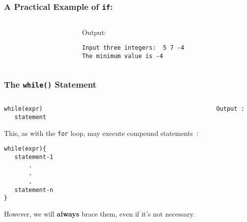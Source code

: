 \begin{frame}[fragile]
\frametitle{A Practical Example of {\tt if}:}
\begin{columns}

\begin{column}{0.5\textwidth}

\end{column}

\begin{column}{0.40\textwidth}
Output:\\
\begin{verbatim}
Input three integers:  5 7 -4
The minimum value is -4
\end{verbatim}
\end{column}

\end{columns}
\end{frame}

\begin{frame}[fragile]
\frametitle{The {\tt while()} Statement}
\begin{columns}

\begin{column}{0.45\textwidth}
\begin{lstlisting}[style=basicc,numbers=none]
while(expr)
   statement
\end{lstlisting}

This, as with the {\tt for} loop, may execute compound statements~:

\begin{lstlisting}[style=basicc,numbers=none]
while(expr){
   statement-1
       .
       .
       .
   statement-n
}
\end{lstlisting}
However, we will {\bf always} brace them, even if it's not necessary.
\end{column}

\begin{column}{0.45\textwidth}

{\scriptsize{\tt Output :}}
\end{column}

\end{columns}
\end{frame}


